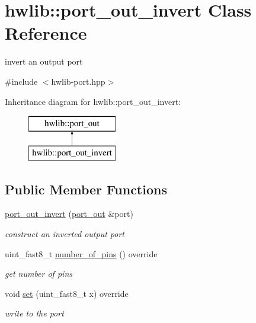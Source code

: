 \hypertarget{classhwlib_1_1port__out__invert}{}\section{hwlib\+:\+:port\+\_\+out\+\_\+invert Class Reference}
\label{classhwlib_1_1port__out__invert}


invert an output port  




{\ttfamily \#include $<$hwlib-\/port.\+hpp$>$}

Inheritance diagram for hwlib\+:\+:port\+\_\+out\+\_\+invert\+:\begin{figure}[H]
\begin{center}
\leavevmode
\includegraphics[height=2.000000cm]{classhwlib_1_1port__out__invert}
\end{center}
\end{figure}
\subsection*{Public Member Functions}
\begin{DoxyCompactItemize}
\item 
\hyperlink{classhwlib_1_1port__out__invert_a4939b1992b6142487c0c537c7a6d29b6}{port\+\_\+out\+\_\+invert} (\hyperlink{classhwlib_1_1port__out}{port\+\_\+out} \&port)
\begin{DoxyCompactList}\small\item\em construct an inverted output port \end{DoxyCompactList}\item 
uint\+\_\+fast8\+\_\+t \hyperlink{classhwlib_1_1port__out__invert_aae7f6f49900f5e4108595a094f467cb8}{number\+\_\+of\+\_\+pins} () override
\begin{DoxyCompactList}\small\item\em get number of pins \end{DoxyCompactList}\item 
void \hyperlink{classhwlib_1_1port__out__invert_a112ff1c0afec7813ce35830f20a3acb3}{set} (uint\+\_\+fast8\+\_\+t x) override
\begin{DoxyCompactList}\small\item\em write to the port \end{DoxyCompactList}\end{DoxyCompactItemize}



